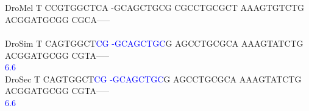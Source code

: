 \documentclass[11pt,twoside,reqno,a4paper]{article}
\begin{document}
{\hspace*{7\charwidth}\hspace*{1\charwidth}\hspace*{1\charwidth}\hspace*{1\charwidth}\hspace*{1\charwidth}\hspace*{1\charwidth}\hspace*{1\charwidth}\\
\\
DroMel	T	CCGTGGCTCA	-GCAGCTGCG	CGCCTGCGCT	AAAGTGTCTG	ACGGATGCGG	CGCA-----\\
\hspace*{7\charwidth}\hspace*{1\charwidth}\hspace*{1\charwidth}\hspace*{1\charwidth}\hspace*{1\charwidth}\hspace*{1\charwidth}\hspace*{1\charwidth}\\
DroSim	T	CAGTGGCT\textcolor{Blue}{C}\textcolor{Blue}{G}	\textcolor{Blue}{-}\textcolor{Blue}{G}\textcolor{Blue}{C}\textcolor{Blue}{A}\textcolor{Blue}{G}\textcolor{Blue}{C}\textcolor{Blue}{T}\textcolor{Blue}{G}\textcolor{Blue}{C}G	AGCCTGCGCA	AAAGTATCTG	ACGGATGCGG	CGTA-----\\
\hspace*{7\charwidth}\hspace*{1\charwidth}\hspace*{9\charwidth}\textcolor{Blue}{6.6}\hspace*{1\charwidth}\hspace*{1\charwidth}\hspace*{1\charwidth}\hspace*{1\charwidth}\hspace*{1\charwidth}\\
DroSec	T	CAGTGGCT\textcolor{Blue}{C}\textcolor{Blue}{G}	\textcolor{Blue}{-}\textcolor{Blue}{G}\textcolor{Blue}{C}\textcolor{Blue}{A}\textcolor{Blue}{G}\textcolor{Blue}{C}\textcolor{Blue}{T}\textcolor{Blue}{G}\textcolor{Blue}{C}G	AGCCTGCGCA	AAAGTATCTG	ACGGATGCGG	CGTA-----\\
\hspace*{7\charwidth}\hspace*{1\charwidth}\hspace*{9\charwidth}\textcolor{Blue}{6.6}\hspace*{1\charwidth}\hspace*{1\charwidth}\hspace*{1\charwidth}\hspace*{1\charwidth}\hspace*{1\charwidth}\\
}
\end{document}

